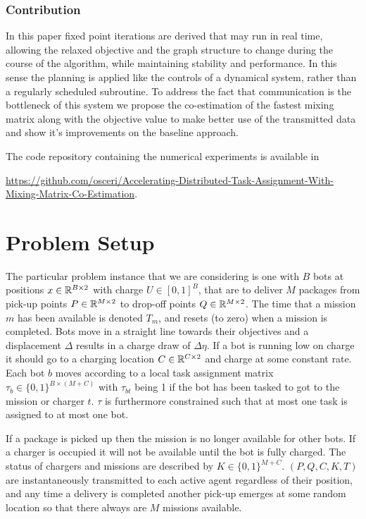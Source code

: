 \documentclass{article}
\newcommand{\sectiontype}{}
\begin{document}
\subsubsection*{Contribution}
In this paper fixed point iterations are derived that may run in real time, allowing the relaxed objective and the graph structure to change during the course of the algorithm, while maintaining stability and performance. In this sense the planning is applied like the controls of a dynamical system, rather than a regularly scheduled subroutine.
To address the fact that communication is the bottleneck of this system we propose the co-estimation of the fastest mixing matrix along with the objective value to make better use of the transmitted data and show it's improvements on the baseline approach. \newline

The code repository containing the numerical experiments is available in 

\url{https://github.com/osceri/Accelerating-Distributed-Task-Assignment-With-Mixing-Matrix-Co-Estimation}.

\section*{Problem Setup}
\renewcommand{\sectiontype}{Problem Setup}
The particular problem instance that we are considering is one with $B$ bots at positions $x \in \mathbb{R}^{B\times2}$ with charge $U \in [0,1]^{B}$, that are to deliver $M$ packages from pick-up points $P \in \mathbb{R}^{M\times2}$ to drop-off points $Q \in \mathbb{R}^{M\times2}$. The time that a mission $m$ has been available is denoted $T_m$, and resets (to zero) when a mission is completed. Bots move in a straight line towards their objectives and a displacement $\Delta$ results in a charge draw of $\Delta \eta$. If a bot is running low on charge it should go to a charging location $C \in \mathbb{R}^{C\times2}$ and charge at some constant rate. Each bot $b$ moves according to a local task assignment matrix $\tau_b \in \{ 0, 1 \}^{B \times (M+C)}$ with $\tau_{bt}$ being 1 if the bot has been tasked to got to the mission or charger $t$. $\tau$ is furthermore constrained such that at most one task is assigned to at most one bot. 
\newline

 If a package is picked up then the mission is no longer available for other bots. If a charger is occupied it will not be available until the bot is fully charged. The status of chargers and missions are described by $K\in \{ 0, 1 \}^{M+C}$. $(P, Q, C, K, T)$ are instantaneously transmitted to each active agent regardless of their position, and any time a delivery is completed another pick-up emerges at some random location so that there always are $M$ missions available. \newline
\end{document}
